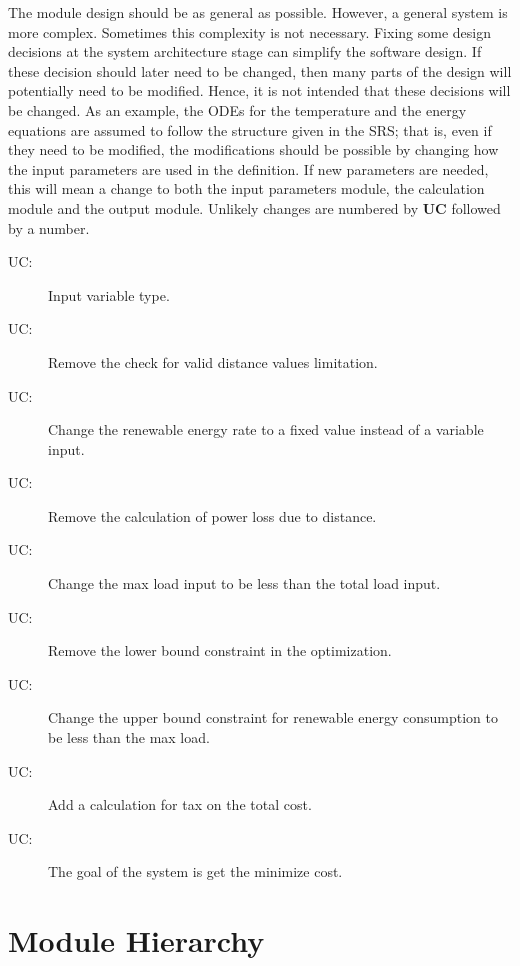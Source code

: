 \documentclass[12pt]{article}
\newcounter{ucnum}
\newcommand{\uctheucnum}{UC\theucnum}
\begin{document}
The module design should be as general as possible. However, a general system is
more complex. Sometimes this complexity is not necessary. Fixing some design
decisions at the system architecture stage can simplify the software design. If
these decision should later need to be changed, then many parts of the design
will potentially need to be modified. Hence, it is not intended that these
decisions will be changed.  As an example, the ODEs for the temperature and the
energy equations are assumed to follow the structure given in the SRS; that is,
even if they need to be modified, the modifications should be possible by
changing how the input parameters are used in the definition.  If new parameters
are needed, this will mean a change to both the input parameters module, the
calculation module and the output module. Unlikely changes are numbered by \textbf{UC} 
followed by a number.

\begin{description}
\item[ \uctheucnum \label{ucIO}:] Input variable type.
\item[ \uctheucnum \label{ucInput}:] Remove the check for valid distance values limitation.
\item[ \uctheucnum \label{ucOutput}:] Change the renewable energy rate to a fixed value instead of a variable input.
\item[ \uctheucnum \label{ucGoal}:] Remove the calculation of power loss due to distance.
\item[ \uctheucnum \label{ucODEstructure}:] Change the max load input to be less than the total load input.
\item[ \uctheucnum \label{ucEnergyStructure}:] Remove the lower bound constraint in the optimization.
\item[ \uctheucnum \label{ucEnergyStructure}:] Change the upper bound constraint for renewable energy consumption to be less than the max load.
\item[ \uctheucnum \label{ucEnergyStructure}:] Add a calculation for tax on the total cost.
\item[ \uctheucnum \label{ucEnergyStructure}:] The goal of the system is get the minimize cost.
\end{description}

\section{Module Hierarchy} \label{SecMH}
\end{document}
